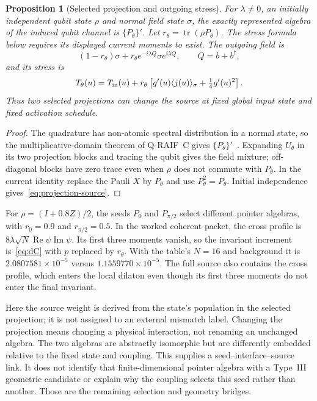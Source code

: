 \documentclass[12pt,a4paper]{article}
\newtheorem{proposition}[theorem]{Proposition}
\begin{document}
\begin{proposition}[Selected projection and outgoing stress]\label{prop:projection-source}
For $\lambda\ne0$, an initially independent qubit state $\rho$ and normal field state $\sigma$, the
exactly represented algebra of the induced qubit channel is $\{P_\theta\}'$. Let
$r_\theta=\operatorname{tr}(\rho P_\theta)$. The stress formula below requires its displayed current moments to exist. The outgoing field is
\[
 (1-r_\theta)\sigma+r_\theta e^{-i\lambda Q}\sigma e^{i\lambda Q},\qquad Q=b+b^\dagger,
\]
and its stress is
\begin{equation}
 T_\theta(u)=T_{\rm in}(u)+r_\theta
 \left[g'(u)\langle j(u)\rangle_\sigma+\tfrac14g'(u)^2\right].
\label{eq:projection-source}
\end{equation}
Thus two selected projections can change the source at fixed global input state and
fixed activation schedule.
\end{proposition}
\begin{proof}
The quadrature has non-atomic spectral distribution in a normal state, so the
multiplicative-domain theorem of Q-RAIF~C gives $\{P_\theta\}'$~\cite{QRC}.
Expanding $U_\theta$ in its two projection blocks and tracing the qubit gives the
field mixture; off-diagonal blocks have zero trace even when $\rho$ does not commute
with $P_\theta$. In the current identity replace the Pauli $X$ by $P_\theta$ and
use $P_\theta^2=P_\theta$. Initial independence gives~\eqref{eq:projection-source}.
\end{proof}

For $\rho=(I+0.8Z)/2$, the seeds $P_0$ and $P_{\pi/2}$ select different pointer
algebras, with $r_0=0.9$ and $r_{\pi/2}=0.5$. In the worked coherent packet,
the cross profile is $8\lambda\sqrt N\operatorname{Re}\psi\operatorname{Im}\psi$.
Its first three moments vanish, so the invariant increment is~\eqref{eq:dC} with
$p$ replaced by $r_\theta$. With the table's $N=16$ and background it is
$2.0807581\times10^{-5}$ versus $1.1559770\times10^{-5}$. The full source also
contains the cross profile, which enters the local dilaton even though its first
three moments do not enter the final invariant.

Here the source weight is derived from the state's population in the selected
projection; it is not assigned to an external mismatch label. Changing the projection
means changing a physical interaction, not renaming an unchanged algebra. The two
algebras are abstractly isomorphic but are differently embedded relative to the fixed
state and coupling. This supplies a seed--interface--source link. It does not identify
that finite-dimensional pointer algebra with a Type~III geometric candidate or explain
why the coupling selects this seed rather than another. Those are the remaining
selection and geometry bridges.
\end{document}
